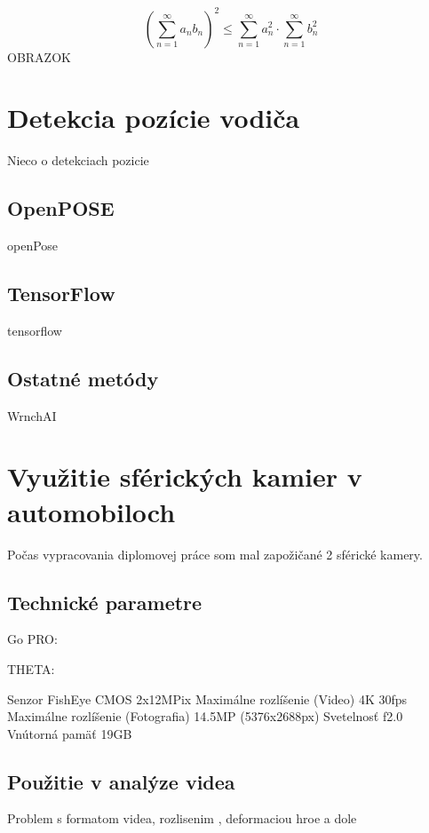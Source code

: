 \documentclass[slovak,master,dept460,male,cpp,cpdeclaration]{diploma}
\begin{document}
\begin{equation}
\left(\sum_{n=1}^{\infty}a_{n}b_{n}\right)^{2} \leq
\sum_{n=1}^{\infty}a_{n}^{2} \cdot \sum_{n=1}^{\infty}b_{n}^{2}
\label{eq:A}
\end{equation}
OBRAZOK

\newpage
\section{Detekcia pozície vodiča}
\label{sec:Pose detection}
Nieco  o detekciach pozicie


\newpage
\subsection{OpenPOSE}
openPose


\newpage
\subsection{TensorFlow}
tensorflow


\newpage
\subsection{Ostatné metódy}
WrnchAI





\newpage
\section{Využitie sférických kamier v automobiloch}
\label{sec:Spherical cameras}
Počas vypracovania diplomovej práce som mal zapožičané 2 sférické kamery. 

\subsection{Technické parametre}
Go PRO:

THETA:

Senzor	FishEye CMOS 2x12MPix
Maximálne rozlíšenie (Video)	4K  30fps
Maximálne rozlíšenie (Fotografia)	14.5MP (5376x2688px)
Svetelnosť	f2.0
Vnútorná pamäť	19GB


\newpage
\subsection{Použitie v analýze videa}
Problem s formatom videa, rozlisenim , deformaciou  hroe a dole
\end{document}
